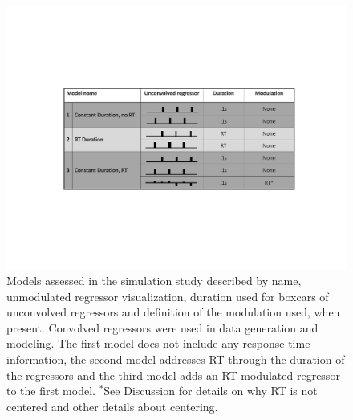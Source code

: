 \documentclass[titlepage,12pt] {article}
\begin{document}
\begin{figure}
  \centering
   \includegraphics[width=6in]{Figures/model_explainer_2cond.pdf}
   \caption{Models assessed in the simulation study described by name, unmodulated regressor visualization, duration used for boxcars of unconvolved regressors and definition of the modulation used, when present.  Convolved regressors were used in data generation and modeling.  The first model does not include any response time information, the second model addresses RT through the duration of the regressors and the third model adds an RT modulated regressor to the first model.  $^*$See Discussion for details on why RT is not centered and other details about centering.}
  \label{fig:models}
\end{figure}
\end{document}
